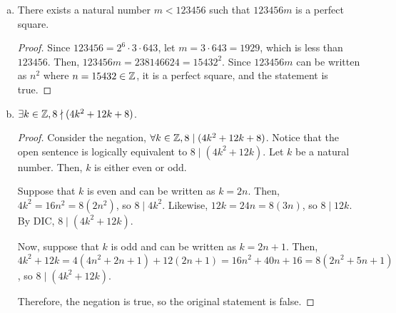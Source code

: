 \begin{enumerate}[(a)]
  \item There exists a natural number $m < 123456$ such that $123456m$ is a perfect square.
        \begin{proof}
          Since $123456=2^6\cdot3\cdot643$, let $m=3\cdot643=1929$, which is less than $123456$.
          Then, $123456m=238146624=15432^2$.
          Since $123456m$ can be written as $n^2$ where $n=15432\in\mathbb{Z}$, it is a perfect square, and the statement is true.
        \end{proof}

  \item $\exists k\in\mathbb{Z}, 8\nmid(4k^2+12k+8)$.
        \begin{proof}
          Consider the negation, $\forall k\in\mathbb{Z}, 8\mid(4k^2+12k+8)$.
          Notice that the open sentence is logically equivalent to $8 \mid (4k^2+12k)$.
          Let $k$ be a natural number. Then, $k$ is either even or odd.

          Suppose that $k$ is even and can be written as $k=2n$.
          Then, $4k^2=16n^2=8(2n^2)$, so $8 \mid 4k^2$.
          Likewise, $12k=24n=8(3n)$, so $8 \mid 12k$.
          By DIC, $8 \mid (4k^2+12k)$.

          Now, suppose that $k$ is odd and can be written as $k=2n+1$.
          Then, $4k^2+12k = 4(4n^2+2n+1)+12(2n+1) = 16n^2 + 40n + 16 = 8(2n^2+5n+1)$, so $8 \mid (4k^2+12k)$.

          Therefore, the negation is true, so the original statement is false.
        \end{proof}
\end{enumerate}


